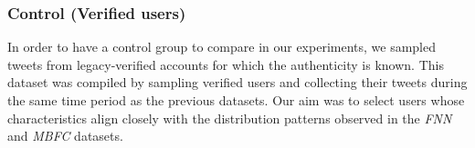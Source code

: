 \subsubsection{Control (Verified users)}
\label{sec:Spreaders-control}

In order to have a control group to compare in our experiments, we sampled tweets from legacy-verified accounts for which the authenticity is known. This dataset was compiled by sampling verified users and collecting their tweets during the same time period as the previous datasets. Our aim was to select users whose characteristics align closely with the distribution patterns observed in the \textit{FNN} and \textit{MBFC} datasets.



\begin{table}[]
\centering
{}
\caption{Number of tweets and users present in each dataset studied. The average size of the tweet (number of characters), along with the Type Token Ratio (TTR) and average emoji presence, are also reported.}
\label{tab:counts}
\end{table}



